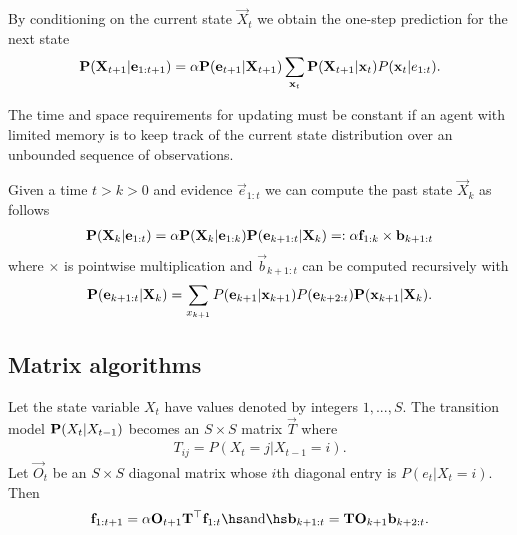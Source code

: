 \documentclass{article}
\begin{document}
\begin{theorem}[R\&N p. 572]
	By conditioning on the current state $\vec X_t$ we obtain the one-step prediction for the
	next state
	\begin{align*}
		\P(\vec X_{t+1}|\vec e_{1:t+1}) = \alpha \P(\vec e_{t+1}|\vec X_{t+1})\sum_{\vec x_t} \P(\vec X_{t+1}|\vec x_t)P(\vec x_t|e_{1:t}).
	\end{align*}
\end{theorem}

\begin{theorem}
	The time and space requirements for updating must be constant if
	an agent with limited memory is to keep track of the current state
	distribution over an unbounded sequence of observations.
\end{theorem}

\begin{theorem}[R\&N p. 574]
	Given a time $t>k>0$ and evidence $\vec e_{1:t}$ we can compute the
	past state $\vec X_k$ as follows
	\begin{align*}
		\P(\vec X_k|\vec e_{1:t}) = \alpha\P(\vec X_k|\vec e_{1:k})
		\P(\vec e_{k+1:t} | \vec X_k) =: \alpha\vec f_{1:k}\times\vec b_{k+1:t}
	\end{align*}
	where $\times$ is pointwise multiplication and $\vec b_{k+1:t}$ can be
	computed recursively with
	\begin{align*}
		\P(\vec e_{k+1:t}|\vec X_k) = \sum_{x_{k+1}}
		P(\vec e_{k+1}|\vec x_{k+1})P(\vec e_{k+2:t})\P(\vec x_{k+1}|\vec X_k).
	\end{align*}
\end{theorem}

\subsection{Matrix algorithms}

\begin{theorem}[R\&N p. 579]
	Let the state variable $X_t$ have values denoted by
	integers $1,...,S$. The transition model $\P(X_t|X_{t-1})$
	becomes an $S\times S$ matrix $\vec T$ where
	\begin{align*}
		T_{ij} = P(X_t=j|X_{t-1}=i).
	\end{align*}
	Let $\vec O_t$ be an $S\times S$ diagonal matrix whose $i$th
	diagonal entry is $P(e_t|X_t=i)$. Then
	\begin{align*}
		\vec f_{1:t+1} = \alpha \vec O_{t+1}\vec T^\top \vec f_{1:t}
		\hs\text{and}\hs
		\vec b_{k+1:t} = \vec T\vec O_{k+1}\vec b_{k+2:t}.
	\end{align*}
\end{theorem}
\end{document}

